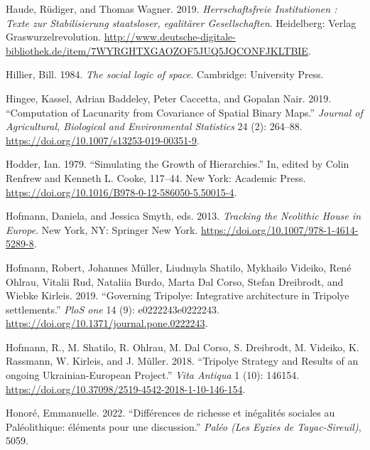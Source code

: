 \documentclass[
  12pt,
  a4paper, twoside]{book}
\newlength{\cslhangindent}
\newlength{\cslentryspacingunit} %
\newenvironment{CSLReferences}[2] %
 {%
  \setlength{\parindent}{0pt}
  \ifodd #1
  \let\oldpar\par
  \def\par{\hangindent=\cslhangindent\oldpar}
  \fi
  \setlength{\parskip}{#2\cslentryspacingunit}
 }%
 {}
\begin{document}
\begin{CSLReferences}{1}{0}
\leavevmode{}%
Haude, Rüdiger, and Thomas Wagner. 2019. \emph{Herrschaftsfreie Institutionen : Texte zur Stabilisierung staatsloser, egalitärer Gesellschaften}. Heidelberg: Verlag Graswurzelrevolution. \url{http://www.deutsche-digitale-bibliothek.de/item/7WYRGHTXGAOZOF5JUQ5JQCONFJKLTBIE}.

\leavevmode{}%
Hillier, Bill. 1984. \emph{The social logic of space}. Cambridge: University Press.

\leavevmode{}%
Hingee, Kassel, Adrian Baddeley, Peter Caccetta, and Gopalan Nair. 2019. {``Computation of Lacunarity from Covariance of Spatial Binary Maps.''} \emph{Journal of Agricultural, Biological and Environmental Statistics} 24 (2): 264--88. \url{https://doi.org/10.1007/s13253-019-00351-9}.

\leavevmode{}%
Hodder, Ian. 1979. {``Simulating the Growth of Hierarchies.''} In, edited by Colin Renfrew and Kenneth L. Cooke, 117--44. New York: Academic Press. \url{https://doi.org/10.1016/B978-0-12-586050-5.50015-4}.

\leavevmode{}%
Hofmann, Daniela, and Jessica Smyth, eds. 2013. \emph{Tracking the Neolithic House in Europe}. New York, NY: Springer New York. \url{https://doi.org/10.1007/978-1-4614-5289-8}.

\leavevmode{}%
Hofmann, Robert, Johannes Müller, Liudmyla Shatilo, Mykhailo Videiko, René Ohlrau, Vitalii Rud, Nataliia Burdo, Marta Dal Corso, Stefan Dreibrodt, and Wiebke Kirleis. 2019. {``Governing Tripolye: Integrative architecture in Tripolye settlements.''} \emph{PloS one} 14 (9): e0222243e0222243. \url{https://doi.org/10.1371/journal.pone.0222243}.

\leavevmode{}%
Hofmann, R., M. Shatilo, R. Ohlrau, M. Dal Corso, S. Dreibrodt, M. Videiko, K. Rassmann, W. Kirleis, and J. Müller. 2018. {``Tripolye {\textendash} Strategy and Results of an ongoing Ukrainian-European Project.''} \emph{Vita Antiqua} 1 (10): 146154. \url{https://doi.org/10.37098/2519-4542-2018-1-10-146-154}.

\leavevmode{}%
Honoré, Emmanuelle. 2022. {``Différences de richesse et inégalités sociales au Paléolithique: éléments pour une discussion.''} \emph{Paléo (Les Eyzies de Tayac-Sireuil)}, 5059.


\end{CSLReferences}
\end{document}
